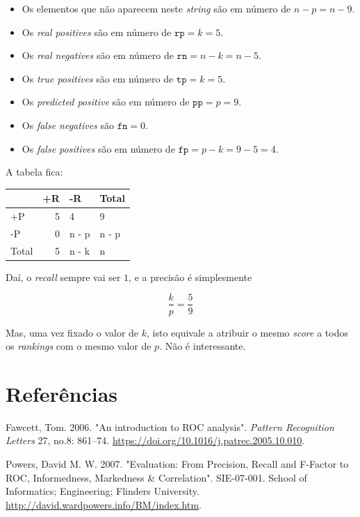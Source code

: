 \documentclass[
  letterpaper,
  DIV=11,
  numbers=noendperiod]{scrreprt}
\newlength{\cslhangindent}
\newenvironment{CSLReferences}[2] %
 {\begin{list}{}{%
  \setlength{\itemindent}{0pt}
  \setlength{\leftmargin}{0pt}
  \setlength{\parsep}{0pt}
  \ifodd #1
   \setlength{\leftmargin}{\cslhangindent}
   \setlength{\itemindent}{-1\cslhangindent}
  \fi
  \setlength{\itemsep}{#2\baselineskip}}}
 {\end{list}}
\begin{document}
\begin{itemize}
\item
  Os elementos que não aparecem neste \emph{string} são em número de
  $n - p = n - 9$.
\item
  Os \emph{real positives} são em número de $\texttt{rp} = k = 5$.
\item
  Os \emph{real negatives} são em número de
  $\texttt{rn} = n - k = n - 5$.
\item
  Os \emph{true positives} são em número de $\texttt{tp} = k = 5$.
\item
  Os \emph{predicted positive} são em número de $\texttt{pp} = p = 9$.
\item
  Os \emph{false negatives} são $\texttt{fn} = 0$.
\item
  Os \emph{false positives} são em número de
  $\texttt{fp} = p - k = 9 - 5 = 4$.
\end{itemize}

A tabela fica:

\begin{longtable*}{lrll}
\toprule
  & +R & -R & Total \\ 
\midrule\addlinespace[2.5pt]
+P & 5 & 4 & 9 \\ 
-P & 0 & n - p & n - p \\ 
Total & 5 & n - k & n \\ 
\bottomrule
\end{longtable*}

Daí, o \emph{recall} sempre vai ser $1$, e a precisão é simplesmente

\[
\frac kp = \frac59
\]

Mas, uma vez fixado o valor de $k$, isto equivale a atribuir o mesmo
\emph{score} a todos os \emph{rankings} com o mesmo valor de $p$. Não é
interessante.


\chapter*{Referências}\label{referuxeancias}


\label{refs}
\begin{CSLReferences}{1}{0}
Fawcett, Tom. 2006. "An introduction to ROC analysis". \emph{Pattern
Recognition Letters} 27, no.8: 861--74.
\url{https://doi.org/10.1016/j.patrec.2005.10.010}.

Powers, David M. W. 2007. "Evaluation: From Precision, Recall and
F-Factor to ROC, Informedness, Markedness \& Correlation". SIE-07-001.
School of Informatics; Engineering; Flinders University.
\url{http://david.wardpowers.info/BM/index.htm}.

\end{CSLReferences}
\end{document}
